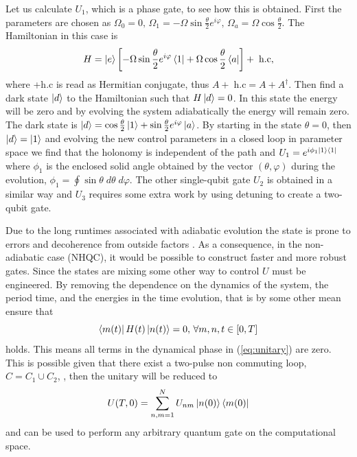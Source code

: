 Let us calculate $U_1$, which is a phase gate, to see how this is obtained. First the parameters are chosen as $\Omega_0 = 0,\,\Omega_1 = -\Omega\sin\frac{\theta}{2}e^{i\varphi},\, \Omega_a = \Omega\cos\frac{\theta}{2}$. The Hamiltonian in this case is 
\begin{equation}
H  = \ket{e}\left[-\Omega\sin\frac{\theta}{2}e^{i\varphi}\bra{1} + \Omega\cos\frac{\theta}{2}\bra{a}\right] + \;\text{h.c},
\end{equation}
where +\;h.c is read as Hermitian conjugate, thus $A +\;\text{h.c} = A + A^\dagger$. Then find a dark state $\ket{d}$ to the Hamiltonian such that $H\ket{d} = 0$. In this state the energy will be zero and by evolving the system adiabatically the energy will remain zero. The dark state is $\ket{d} = \cos\frac{\theta}{2}\ket{1} + \sin\frac{\theta}{2}e^{i\varphi}\ket{a}$. By starting in the state $\theta = 0$, then $\ket{d} = \ket{1}$ and evolving the new control parameters in a closed loop in parameter space we find that the holonomy is independent of the path and $U_1 = e^{i\phi_1\ket{1}\bra{1}}$ where $\phi_1$ is the enclosed solid angle obtained by the vector $(\theta,\varphi)$ during the evolution, $\phi_1 = \oint \sin\theta\; d\theta \;d\varphi$. The other single-qubit gate $U_2$ is obtained in a similar way and $U_3$ requires some extra work by using detuning to create a two-qubit gate.



Due to the long runtimes associated with adiabatic evolution the state is prone to errors and decoherence from outside factors \cite{NHQC}. As a consequence, in the non-adiabatic case (NHQC), it would be possible to construct faster and more robust gates. Since the states are mixing some other way to control $U$ must be engineered. By removing the dependence on the dynamics of the system, the period time, and the energies in the time evolution, that is by some other mean ensure that 
\begin{equation}
\bra{m(t)}H(t)\ket{n(t)} = 0,\,\forall m,n, t\in[0,T]
\end{equation} 
holds. This means all terms in the dynamical phase in (\ref{eq:unitary}) are zero.
This is possible given that there exist a two-pulse non commuting loop, $C = C_1 \cup C_2$, \cite{NHQC,sLoop}, 
then the unitary will be reduced to 
\begin{equation}
U(T,0) = \sum_{n,m = 1}^{N} U_{nm}\ket{n(0)}\bra{m(0)}
\end{equation}
and can be used to perform any arbitrary quantum gate on the computational space.

